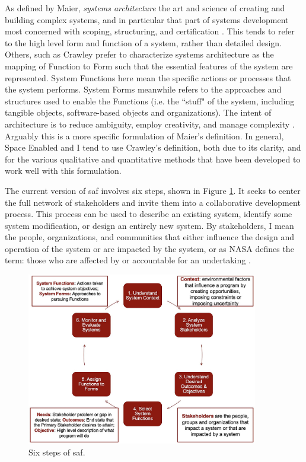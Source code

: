 As defined by Maier, \textit{systems architecture} the art and science of creating and building complex systems, and in particular that part of systems development most concerned with scoping, structuring, and certification \cite{maierArtSystemsArchitecting2009}. This tends to refer to the high level form and function of a system, rather than detailed design. Others, such as Crawley prefer to characterize systems architecture as the mapping of Function to Form such that the essential features of the system are represented. System Functions here mean the specific actions or processes that the system performs. System Forms meanwhile refers to the approaches and structures used to enable the Functions (i.e. the ``stuff" of the system, including tangible objects, software-based objects and organizations). The intent of architecture is to reduce ambiguity, employ creativity, and manage complexity \cite{crawleySystemArchitectureStrategy2015}. Arguably this is a more specific formulation of Maier's definition. In general, Space Enabled and I tend to use Crawley's definition, both due to its clarity, and for the various qualitative and quantitative methods that have been developed to work well with this formulation. 

The current version of \ac{saf} involves six steps, shown in Figure \ref{fig:saf}. It seeks to center the full network of stakeholders and invite them into a collaborative development process. This process can be used to describe an existing system, identify some system modification, or design an entirely new system. By stakeholders, I mean the people, organizations, and communities that either influence the design and operation of the system or are impacted by the system, or as NASA defines the term: those who are affected by or accountable for an undertaking \cite{nasaofficeofthechiefengineerNASASystemsEngineering2004}. 

\begin{figure}[!htb] 
\centering
\includegraphics[width=0.9\textwidth]{Figures/chap3/SAF.jpg}
\caption[Six steps of SAF]{Six steps of \ac{saf}.}
\label{fig:saf}
\end{figure}

